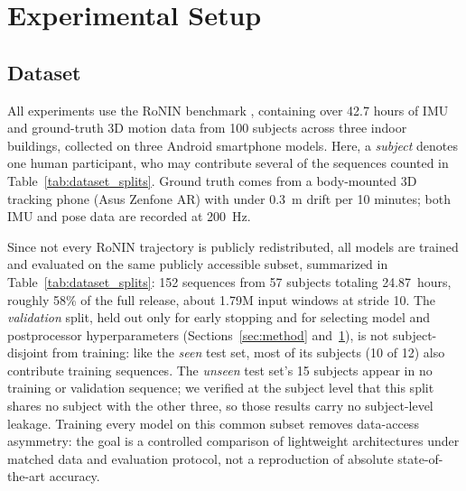 \documentclass[10pt,conference,letterpaper]{IEEEtran}
\begin{document}
\section{Experimental Setup}
\label{sec:exp}

\subsection{Dataset}

All experiments use the RoNIN benchmark \cite{ronin2019}, containing
over 42.7 hours of IMU and ground-truth 3D motion data from 100
subjects across three indoor buildings, collected on three Android
smartphone models. Here, a \emph{subject} denotes one human
participant, who may contribute several of the sequences counted in
Table~\ref{tab:dataset_splits}. Ground truth comes from a body-mounted
3D tracking phone (Asus Zenfone AR) with under 0.3~m drift per 10
minutes; both IMU and pose data are recorded at 200~Hz.

Since not every RoNIN trajectory is publicly redistributed, all
models are trained and evaluated on the same publicly accessible
subset, summarized in Table~\ref{tab:dataset_splits}: 152 sequences
from 57 subjects totaling 24.87~hours, roughly 58\% of the full
release, about 1.79M input windows at stride 10. The
\emph{validation} split, held out only for early stopping and for
selecting model and postprocessor hyperparameters
(Sections~\ref{sec:method} and~\ref{sec:exp}), is not subject-disjoint
from training: like the \emph{seen} test set, most of its subjects (10
of 12) also contribute training sequences. The \emph{unseen} test
set's 15 subjects appear in no training or validation sequence; we
verified at the subject level that this split shares no subject with
the other three, so those results carry no subject-level leakage.
Training every model on this common subset removes data-access
asymmetry: the goal is a controlled comparison of lightweight
architectures under matched data and evaluation protocol, not a
reproduction of absolute state-of-the-art accuracy.
\end{document}
